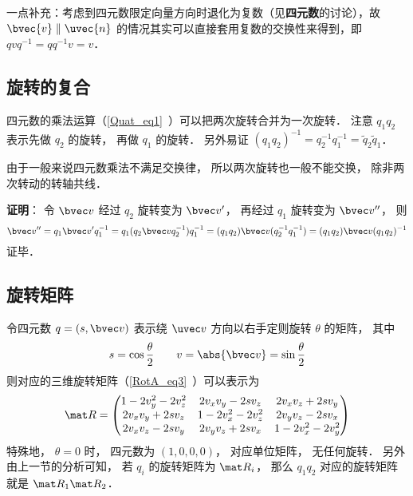 一点补充：考虑到四元数限定向量方向时退化为复数（见\textbf{四元数}的讨论），故 $\bvec{v}\parallel{\uvec{n}}$ 的情况其实可以直接套用复数的交换性来得到，即 $qvq^{-1}=qq^{-1}v=v$．

\subsection{旋转的复合}
四元数的乘法运算（\autoref{Quat_eq1}~）可以把两次旋转合并为一次旋转． 注意 $q_1q_2$ 表示先做 $q_2$ 的旋转， 再做 $q_1$ 的旋转． 另外易证 $(q_1q_2)^{-1} = q_2^{-1} q_1^{-1} = \tilde q_2\tilde q_1$．

由于一般来说四元数乘法不满足交换律， 所以两次旋转也一般不能交换， 除非两次转动的转轴共线．

\textbf{证明}： 令 $\bvec v$ 经过 $q_2$ 旋转变为 $\bvec v'$， 再经过 $q_1$ 旋转变为 $\bvec v''$， 则
\begin{equation}
\bvec v'' = q_1\bvec v'q_1^{-1} = q_1(q_2\bvec vq_2^{-1}) q_1^{-1} = (q_1q_2)\bvec v(q_2^{-1} q_1^{-1}) = (q_1q_2)\bvec v(q_1q_2)^{-1}
\end{equation}
证毕．

\subsection{旋转矩阵}
令四元数 $q = (s, \bvec v)$ 表示绕 $\uvec v$ 方向以右手定则旋转 $\theta$ 的矩阵， 其中
\begin{equation}
s = \cos\frac{\theta}{2} \qquad
v = \abs{\bvec v} = \sin\frac{\theta}{2}
\end{equation}
则对应的三维旋转矩阵（\autoref{RotA_eq3}~）可以表示为
\begin{equation}\label{QuatN_eq2}
\mat R =
\begin{pmatrix}
1 - 2v_y^2 - 2v_z^2 & 2v_xv_y - 2sv_z  & 2v_x v_z + 2s v_y\\
2v_x v_y + 2sv_z & 1 - 2v_x^2 - 2v_z^2 & 2v_y v_z - 2s v_x\\
2v_x v_z - 2s v_y & 2v_y v_z + 2s v_x & 1 - 2v_x^2 - 2v_y^2
\end{pmatrix}
\end{equation}
特殊地， $\theta = 0$ 时， 四元数为 $(1,0,0,0)$， 对应单位矩阵， 无任何旋转． 另外由上一节的分析可知， 若 $q_i$ 的旋转矩阵为 $\mat R_i$， 那么 $q_1q_2$ 对应的旋转矩阵就是 $\mat R_1\mat R_2$．

